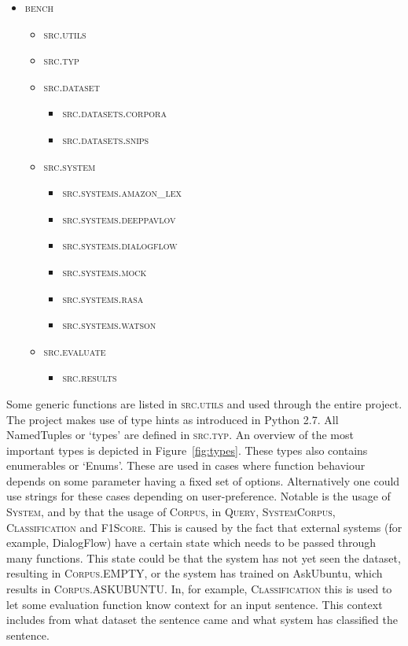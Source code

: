 \begin{itemize}
    \item \textsc{bench}
    \begin{itemize}
        \item \textsc{src.utils}
        \item \textsc{src.typ}
        \item \textsc{src.dataset}
        \begin{itemize}
            \item \textsc{src.datasets.corpora}
            \item \textsc{src.datasets.snips}
        \end{itemize}
        \item \textsc{src.system}
        \begin{itemize}
            \item \textsc{src.systems.amazon\_lex}
            \item \textsc{src.systems.deeppavlov}
            \item \textsc{src.systems.dialogflow}
            \item \textsc{src.systems.mock}
            \item \textsc{src.systems.rasa}
            \item \textsc{src.systems.watson}
        \end{itemize}
        \item \textsc{src.evaluate}
        \begin{itemize}
            \item \textsc{src.results}
        \end{itemize}
    \end{itemize}
\end{itemize}

Some generic functions are listed in \textsc{src.utils} and used through the entire project.
The project makes use of type hints as introduced in Python 2.7.
All NamedTuples or `types' are defined in \textsc{src.typ}.
An overview of the most important types is depicted in Figure~\ref{fig:types}.
These types also contains enumerables or `Enums'.
These are used in cases where function behaviour depends on some parameter having a fixed set of options.
Alternatively one could use strings for these cases depending on user-preference.
Notable is the usage of \textsc{System}, and by that the usage of \textsc{Corpus}, in \textsc{Query}, \textsc{SystemCorpus}, \textsc{Classification} and \textsc{F1Score}.
This is caused by the fact that external systems (for example, DialogFlow) have a certain state which needs to be passed through many functions.
This state could be that the system has not yet seen the dataset, resulting in \textsc{Corpus.EMPTY}, or the system has trained on AskUbuntu, which results in \textsc{Corpus.ASKUBUNTU}.
In, for example, \textsc{Classification} this is used to let some evaluation function know context for an input sentence.
This context includes from what dataset the sentence came and what system has classified the sentence.

